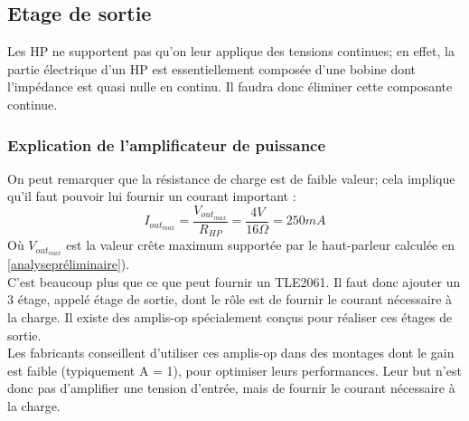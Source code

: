 \subsection{Etage de sortie}
Les HP ne supportent pas qu'on leur applique des tensions continues; en effet, la partie électrique d'un HP est essentiellement composée d'une bobine dont l'impédance est quasi nulle en continu. Il faudra donc éliminer cette composante continue.
\subsubsection{Explication de l'amplificateur de puissance}
On peut remarquer que la résistance de charge est de faible valeur; cela implique qu'il faut pouvoir lui fournir un courant important :
$$I_{{out}_{max}}=\frac{V_{{out}_{max}}}{R_{HP}}=\frac{4V}{16\Omega}=250mA$$
Où $V_{{out}_{max}}$ est la valeur crête maximum supportée par le haut-parleur
calculée en \ref{analysepréliminaire}).\\

C'est beaucoup plus que ce que peut fournir un TLE2061. Il faut donc ajouter un 3 étage, appelé étage de sortie, dont le rôle est de fournir le courant nécessaire à la charge. Il existe des amplis-op spécialement conçus pour réaliser ces étages de sortie.\\
Les fabricants conseillent d'utiliser ces amplis-op dans des montages dont le gain est faible (typiquement A = 1), pour optimiser leurs performances. Leur but n'est donc pas d'amplifier une tension d'entrée, mais de fournir le courant nécessaire à la charge.\\

